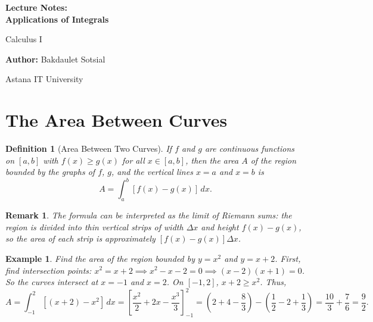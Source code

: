 \documentclass[11pt,a4paper]{article}
\newtheorem{example}{Example}
\newtheorem{definition}{Definition}
\newtheorem{remark}{Remark}
\begin{document}
\begin{titlepage}
\centering
\vspace*{4cm}
{\Huge\bfseries Lecture Notes:\\ Applications of Integrals\par}
\vspace{1cm}
{\Large Calculus I\par}
\vspace{2cm}
{\large \textbf{Author:} Bakdaulet Sotsial\par}
\vspace{1cm}
\vfill
{\small Astana IT University \par}
\vspace*{2cm}
\end{titlepage}
\tableofcontents
\newpage
\section{The Area Between Curves}
\begin{definition}[Area Between Two Curves]
If $f$ and $g$ are continuous functions on $[a, b]$ with $f(x) \geq g(x)$ for all $x \in [a, b]$, then the area $A$ of the region bounded by the graphs of $f$, $g$, and the vertical lines $x = a$ and $x = b$ is
\[
A = \int_a^b [f(x) - g(x)] \, dx.
\]
\end{definition}
\begin{remark}
The formula can be interpreted as the limit of Riemann sums: the region is divided into thin vertical strips of width $\Delta x$ and height $f(x) - g(x)$, so the area of each strip is approximately $[f(x) - g(x)] \Delta x$.
\end{remark}
\begin{center}
\end{center}
\begin{example}
Find the area of the region bounded by $y = x^2$ and $y = x + 2$.
First, find intersection points: $x^2 = x + 2 \implies x^2 - x - 2 = 0 \implies (x - 2)(x + 1) = 0$. So the curves intersect at $x = -1$ and $x = 2$.
On $[-1, 2]$, $x + 2 \geq x^2$. Thus,
\[
A = \int_{-1}^2 [(x + 2) - x^2] \, dx = \left[ \frac{x^2}{2} + 2x - \frac{x^3}{3} \right]_{-1}^2 = \left( 2 + 4 - \frac{8}{3} \right) - \left( \frac{1}{2} - 2 + \frac{1}{3} \right) = \frac{10}{3} + \frac{7}{6} = \frac{9}{2}.
\]
\end{example}
\end{document}
